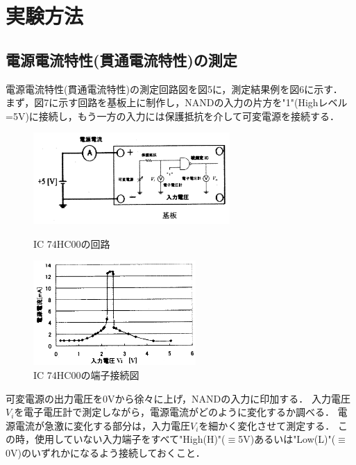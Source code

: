 \documentclass[10pt, a4j, dvipdfmx]{jarticle}
\begin{document}
\newpage
\section{実験方法}
\subsection{電源電流特性(貫通電流特性)の測定}
電源電流特性(貫通電流特性)の測定回路図を図5に，測定結果例を図6に示す．
まず，図7に示す回路を基板上に制作し，NANDの入力の片方を"1"(Highレベル=5V)に接続し，もう一方の入力には保護抵抗を介して可変電源を接続する．
\begin{figure}[H]
  \begin{minipage}{0.5\hsize}
    \centering
    \includegraphics[width=75mm]{実験テキスト/図5.png}
    \caption{IC 74HC00の回路}
  \end{minipage}
  \begin{minipage}{0.5\hsize}
    \centering
    \includegraphics[height=40mm]{実験テキスト/図6.png}
    \caption{IC 74HC00の端子接続図}
  \end{minipage}
\end{figure}
可変電源の出力電圧を0Vから徐々に上げ，NANDの入力に印加する．
入力電圧$V_i$を電子電圧計で測定しながら，電源電流がどのように変化するか調べる．
電源電流が急激に変化する部分は，入力電圧$V_i$を細かく変化させて測定する．
この時，使用していない入力端子をすべて"High(H)"($\equiv$5V)あるいは"Low(L)"($\equiv$0V)のいずれかになるよう接続しておくこと．
\end{document}

